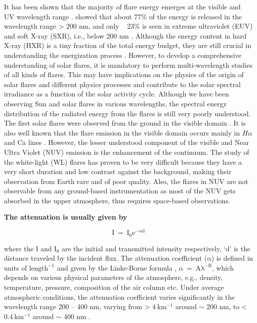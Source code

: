 It has been shown that the majority of flare energy emerges at the visible and UV wavelength range \citep{woods06}. \cite{woods04} showed that about 77\% of the energy is released in the wavelength range > 200 nm, and only ~ 23\% is seen in extreme ultraviolet (EUV) and soft X-ray (SXR), i.e., below 200 nm \citep{Nei_1989,neidig93,kretzschmar11}. Although the energy content in hard X-ray (HXR) is a tiny fraction of the total energy budget, they are still crucial in understanding the energization process \citep{holeman11}. However, to develop a comprehensive understanding of solar flares, it is mandatory to perform multi-wavelength studies of all kinds of flares. This may have implications on the physics of the origin of solar flares and different physics processes and contribute to the solar spectral irradiance as a function of the solar activity cycle. Although we have been observing Sun and solar flares in various wavelengths, the spectral energy distribution of the radiated energy from the flares is still very poorly understood. The first solar flares were observed from the ground in the visible domain \citep{carrington1859,neidig93}. It is also well known that the flare emission in the visible domain occurs mainly in $H\alpha$ and Ca  lines \citep{canfield90,falchi92,heinzel94}. However, the lesser understood component of the visible and Near Ultra Violet (NUV) emission is the enhancement of the continuum. The study of the white-light (WL) flares has proven to be very difficult because they have a very short duration and low contrast against the background, making their observation from Earth rare and of poor quality. Also, the flares in NUV are not observable from any ground-based instrumentation as most of the NUV gets absorbed in the upper atmosphere, thus requires space-based observations. {\bf The attenuation is usually given by

\begin{equation}
    \mathrm{I~=~I_{0}e^{-\alpha d}}
\end{equation}

where the I and $\mathrm{I_{0}}$ are the initial and transmitted intensity respectively, `d' is the distance traveled by the incident flux. The attenuation coefficient ($\mathrm{\alpha}$) is defined in units of $\mathrm{length^{-1}}$ and given by the Linke-Borne formula \citep{linke22, middleton51}, $\mathrm{\alpha~=~A\lambda^{-B}}$, which depends on various physical parameters of the atmosphere, e.g., density, temperature, pressure, composition of the air column etc. Under average atmospheric conditions, the attenuation coefficient varies significantly in the wavelength range 200 {--} 400 nm, varying from > $\mathrm{4~km^{-1}}$ around $\sim$ 200 nm, to < $\mathrm{0.4~km^{-1}}$ around $\sim$ 400 nm \citep[see Fig.7, Fig.83 and the accompanying discussions in][]{baum_thes}.}

